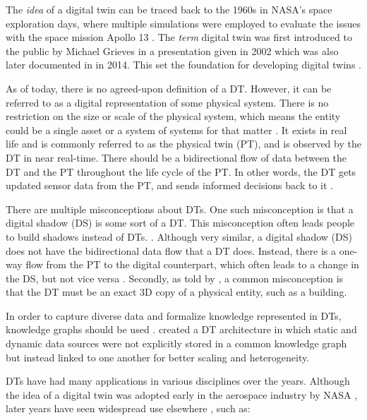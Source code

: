 \documentclass{article}
\begin{document}
The \emph{idea} of a digital twin can be traced back to the 1960s in NASA's space exploration days, where multiple simulations were employed to evaluate the issues with the space mission Apollo 13 \cite{noauthor_digital_nodate, fuller_digital_2020}. The \emph{term} digital twin was first introduced to the public by Michael Grieves in a presentation given in 2002 which was also later documented in \cite{grieves_michael_digital_2014} in 2014. This set the foundation for developing digital twins \cite{grieves_michael_digital_2014, fuller_digital_2020}.

As of today, there is no agreed-upon definition of a DT. However, it can be referred to as a digital representation of some physical system. There is no restriction on the size or scale of the physical system, which means the entity could be a single asset or a system of systems for that matter \cite{li_digital_2022, waszak_let_2022}. It exists in real life and is commonly referred to as the physical twin (PT), and is observed by the DT in near real-time. There should be a bidirectional flow of data between the DT and the PT throughout the life cycle of the PT. In other words, the DT gets updated sensor data from the PT, and sends informed decisions back to it \cite{madni_leveraging_2019, waszak_let_2022, kamburjan_digital_2022}.


There are multiple misconceptions about DTs. One such misconception is that a digital shadow (DS) is some sort of a DT. This misconception often leads people to build shadows instead of DTs. \cite{fuller_digital_2020, li_digital_2022}.  Although very similar, a digital shadow (DS) does not have the bidirectional data flow that a DT does. Instead, there is a one-way flow from the PT to the digital counterpart, which often leads to a change in the DS, but not vice versa \cite{kritzinger_digital_2018, li_digital_2022}. Secondly, as told by \citeauthor{fuller_digital_2020}, a common misconception is that the DT must be an exact 3D copy of a physical entity, such as a building.

In order to capture diverse data and formalize knowledge represented in DTs, knowledge graphs should be used \cite{kamburjan_programming_2021, waszak_let_2022}. \citeauthor{waszak_let_2022} created a DT architecture in which static and dynamic data sources were not explicitly stored in a common knowledge graph but instead linked to one another for better scaling and heterogeneity.

DTs have had many applications in various disciplines over the years. Although the idea of a digital twin was adopted early in the aerospace industry by NASA \cite{li_digital_2022}, later years have seen widespread use elsewhere \cite{fuller_digital_2020, waszak_let_2022, macchi_exploring_2018}, such as:
\end{document}
